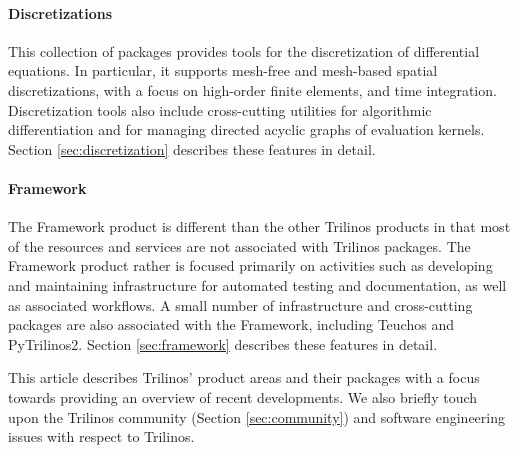 \paragraph{Discretizations} This collection of packages provides tools for the discretization of differential equations. In particular, it supports mesh-free and mesh-based spatial discretizations, with a focus on high-order finite elements, and time integration. Discretization tools also include cross-cutting utilities for algorithmic differentiation and for managing directed acyclic graphs of evaluation kernels. Section \ref{sec:discretization} describes these features in detail.

\paragraph{Framework} The Framework product is different than the other Trilinos products in that most of the resources and services are not associated with Trilinos packages. The Framework product rather is focused primarily on activities such as developing and maintaining infrastructure for automated testing and documentation, as well as associated workflows. A small number of infrastructure and cross-cutting packages are also associated with the Framework, including Teuchos and PyTrilinos2. Section \ref{sec:framework} describes these features in detail.

This article describes Trilinos' product areas and their packages with a focus towards providing an overview of recent developments. We also briefly touch upon the Trilinos community (Section \ref{sec:community}) and software engineering issues with respect to Trilinos.

